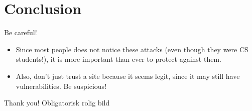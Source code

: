 \documentclass{beamer}
\begin{document}
\section{Conclusion}

\begin{frame}{Be careful!}
    \begin{itemize}
        \item Since most people does not notice these attacks (even though they
              were CS students!), it is more important than ever to protect
              against them.
        \item Also, don't just trust a site because it seems legit, since it may
              still have vulnerabilities. Be suspicious!
    \end{itemize}
\end{frame}

\begin{frame}{Thank you!}
Obligatorisk rolig bild
\end{frame}
\end{document}
